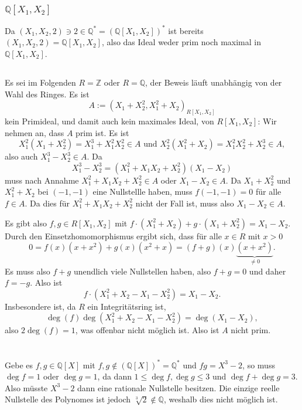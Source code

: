 \documentclass[a4paper,10pt]{article}
\theoremstyle{definition}
\newcommand{\Z}{\mathbb{Z}}
\newcommand{\Q}{\mathbb{Q}}
\begin{document}
\subsubsection{$\Q[X_1, X_2]$}
Da $(X_1, X_2, 2) \ni 2 \in \Q^* = (\Q[X_1, X_2])^*$ ist bereits $(X_1, X_2, 2) = \Q[X_1, X_2]$, also das Ideal weder prim noch maximal in $\Q[X_1, X_2]$.


\subsection{}
Es sei im Folgenden $R = \Z$ oder $R = \Q$, der Beweis läuft unabhängig von der Wahl des Ringes. Es ist
\[
 A := (X_1 + X_2^2, X_1^2 + X_2)_{R[X_1, X_2]}
\]
kein Primideal, und damit auch kein maximales Ideal, von $R[X_1, X_2]$: Wir nehmen an, dass $A$ prim ist. Es ist
\[
 X_1^2 (X_1 + X_2^2) = X_1^3 + X_1^2 X_2^2 \in A \text{ und }
 X_2^2 (X_1^2 + X_2) = X_1^2 X_2^2 + X_2^3 \in A,
\]
also auch $X_1^3 - X_2^3 \in A$. Da
\[
 X_1^3 - X_2^3 = (X_1^2 + X_1 X_2 + X_2^2)(X_1 - X_2)
\]
muss nach Annahme $X_1^2 + X_1 X_2 + X_2^2 \in A$ oder $X_1 - X_2 \in A$. Da $X_1+X_2^2$ und $X_1^2+X_2$ bei $(-1,-1)$ eine Nullstellle haben, muss $f(-1,-1) = 0$ für alle $f \in A$. Da dies für $X_1^2 + X_1 X_2 + X_2^2$ nicht der Fall ist, muss also $X_1 - X_2 \in A$.

Es gibt also $f,g \in R[X_1, X_2]$ mit $f \cdot (X_1^2+X_2) + g \cdot (X_1+X_2^2) = X_1 - X_2$. Durch den Einsetzhomomorphismus ergibt sich, dass für alle $x \in R$ mit $x > 0$
\[
 0 = f(x)(x+x^2)+g(x)(x^2+x) = (f+g)(x)\underbrace{(x+x^2)}_{\neq 0}.
\]
Es muss also $f+g$ unendlich viele Nullstellen haben, also $f+g=0$ und daher $f=-g$. Also ist
\[
 f\cdot (X_1^2 +X_2 -X_1- X_2^2) = X_1 - X_2.
\]
Insbesondere ist, da $R$ ein Integritätsring ist,
\[
 \deg(f) \deg(X_1^2 +X_2 -X_1- X_2^2) = \deg(X_1 - X_2),
\]
also $2 \deg(f) = 1$, was offenbar nicht möglich ist. Also ist $A$ nicht prim.








\section{}


\subsection{}
Gebe es $f,g \in \Q[X]$ mit $f,g \not\in (\Q[X])^* = \Q^*$ und $fg = X^3-2$, so muss $\deg f = 1$ oder $\deg g = 1$, da dann $1 \leq \deg f, \deg g \leq 3$ und $\deg f + \deg g = 3$. Also müsste $X^3-2$ dann eine rationale Nullstelle besitzen. Die einzige reelle Nullstelle des Polynomes ist jedoch $\sqrt[3]{2} \not\in \Q$, weshalb dies nicht möglich ist.
\end{document}
